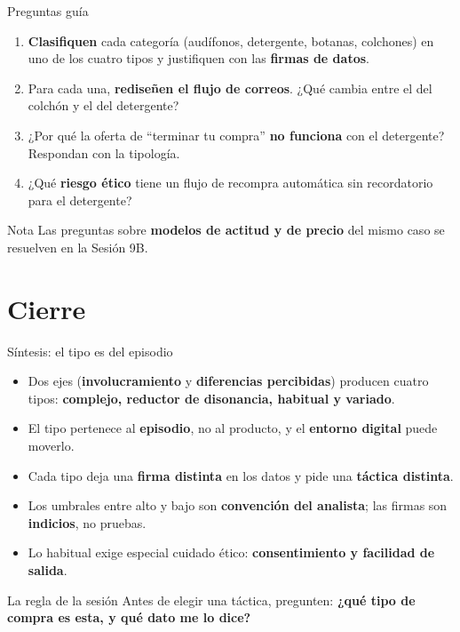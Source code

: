 \documentclass[aspectratio=169,xcolor=dvipsnames]{beamer}
\begin{document}
\begin{frame}{Preguntas guía}
\small
\begin{enumerate}
  \item \textbf{Clasifiquen} cada categoría (audífonos, detergente, botanas, colchones) en uno de los cuatro tipos y justifiquen con las \textbf{firmas de datos}.
  \vspace{3pt}
  \item Para cada una, \textbf{rediseñen el flujo de correos}. ¿Qué cambia entre el del colchón y el del detergente?
  \vspace{3pt}
  \item ¿Por qué la oferta de \enquote{terminar tu compra} \textbf{no funciona} con el detergente? Respondan con la tipología.
  \vspace{3pt}
  \item ¿Qué \textbf{riesgo ético} tiene un flujo de recompra automática sin recordatorio para el detergente?
\end{enumerate}
\begin{alertblock}{Nota}
  \small Las preguntas sobre \textbf{modelos de actitud y de precio} del mismo caso se resuelven en la Sesión 9B.
\end{alertblock}
\end{frame}

\section{Cierre}

\begin{frame}{Síntesis: el tipo es del episodio}
\begin{itemize}
  \small
  \item Dos ejes (\textbf{involucramiento} y \textbf{diferencias percibidas}) producen cuatro tipos: \textbf{complejo, reductor de disonancia, habitual y variado}.
  \item El tipo pertenece al \textbf{episodio}, no al producto, y el \textbf{entorno digital} puede moverlo.
  \item Cada tipo deja una \textbf{firma distinta} en los datos y pide una \textbf{táctica distinta}.
  \item Los umbrales entre alto y bajo son \textbf{convención del analista}; las firmas son \textbf{indicios}, no pruebas.
  \item Lo habitual exige especial cuidado ético: \textbf{consentimiento y facilidad de salida}.
\end{itemize}
\vspace{4pt}
\begin{alertblock}{La regla de la sesión}
  \small Antes de elegir una táctica, pregunten: \textbf{¿qué tipo de compra es esta, y qué dato me lo dice?}
\end{alertblock}
\end{frame}
\end{document}
